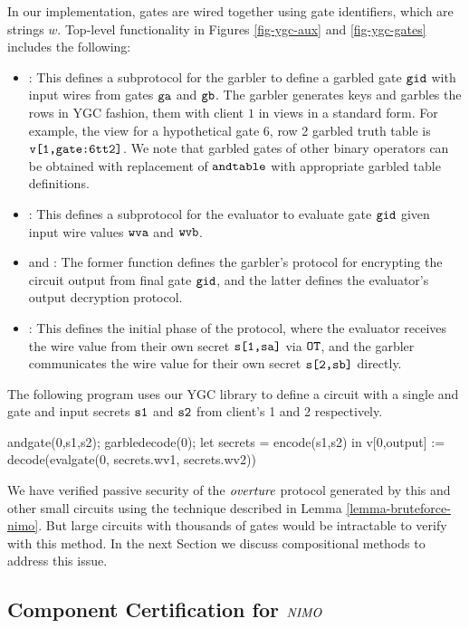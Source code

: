 In our implementation, gates are wired together using gate
identifiers, which are strings $w$. Top-level functionality in Figures
\ref{fig-ygc-aux} and \ref{fig-ygc-gates} includes the following:
\begin{itemize}
\item {}: This defines a subprotocol for the garbler
  to define a garbled gate $\texttt{gid}$ with input wires from gates
  $\texttt{ga}$ and $\texttt{gb}$. The garbler generates keys and garbles
  the rows in YGC fashion, them with client $1$ in
  views in a standard form. For example, the view for
  a hypothetical gate 6, row 2 garbled truth table is $\texttt{v[1,gate:6tt2]}$.
  We note that garbled gates of other binary operators can be obtained with
  replacement of $\texttt{andtable}$ with appropriate garbled table definitions. 
\item {}: This defines a subprotocol for the evaluator to
  evaluate gate $\texttt{gid}$ given input wire values $\texttt{wva}$ and
  $\texttt{wvb}$.
\item {} and : The former function
  defines the garbler's protocol for encrypting the circuit
  output from final gate $\texttt{gid}$, and the latter defines
  the evaluator's output decryption protocol.
\item {}: This defines the initial phase of the protocol,
  where the evaluator receives the wire value from their own
  secret $\texttt{s[1,sa]}$ via $\texttt{OT}$, and the garbler communicates
  the wire value for their own secret $\texttt{s[2,sb]}$ directly.
\end{itemize}
\begin{example}
  \label{example-andcircuit}
The following program uses our YGC library to define
a circuit with a single and gate and input secrets $\texttt{s1}$ and
$\texttt{s2}$ from client's 1 and 2 respectively. 
\begin{verbatimtab}
  andgate(0,s1,s2);
  garbledecode(0);
  let secrets = encode(s1,s2) in
  v[0,output] := decode(evalgate(0, secrets.wv1, secrets.wv2))
\end{verbatimtab}
\end{example}
We have verified passive security of the $\mathit{overture}$ protocol
generated by this and other small circuits using the
technique described in Lemma \ref{lemma-bruteforce-nimo}.
But large circuits with thousands of gates would be
intractable to verify with this method. In the next Section
we discuss compositional methods to address this issue.

\subsection{Component Certification for $\mathit{NIMO}$}
\label{section-composition-certification}

